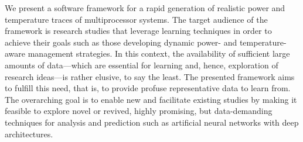 We present a software framework for a rapid generation of realistic power and
temperature traces of multiprocessor systems. The target audience of the
framework is research studies that leverage learning techniques in order to
achieve their goals such as those developing dynamic power- and
temperature-aware management strategies. In this context, the availability of
sufficient large amounts of data---which are essential for learning and, hence,
exploration of research ideas---is rather elusive, to say the least. The
presented framework aims to fulfill this need, that is, to provide profuse
representative data to learn from. The overarching goal is to enable new and
facilitate existing studies by making it feasible to explore novel or revived,
highly promising, but data-demanding techniques for analysis and prediction such
as artificial neural networks with deep architectures.
